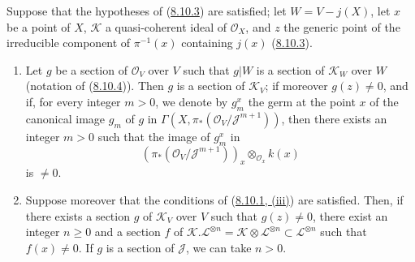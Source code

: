 \begin{corollary}[8.10.5]
\label{II.8.10.5}
Suppose that the hypotheses of (\hyperref[II.8.10.3]{8.10.3}) are
satisfied; let $W=V-j(X)$, let $x$ be a point of $X$, $\mathcal{K}$ a
quasi-coherent ideal of $\mathcal{O}_X$, and $z$ the generic point of the
irreducible component of $\pi^{-1}(x)$ containing $j(x)$
(\hyperref[II.8.10.3]{8.10.3}).
\begin{enumerate}
  \item[\rm{(i)}] Let $g$ be a section of $\mathcal{O}_V$ over $V$
  such that $g|W$ is a section of $\mathcal{K}_W$ over $W$
  (notation of (\hyperref[II.8.10.4]{8.10.4})). Then $g$ is a section
  of $\mathcal{K}_V$; if moreover $g(z)\neq0$, and if, for every integer
  $m>0$, we denote by $g_m^x$ the germ at the point $x$ of the canonical
  image $g_m$ of $g$ in
  $\Gamma(X,\pi_*(\mathcal{O}_V/\mathcal{J}^{m+1}))$, then there exists an
  integer $m>0$ such that the image of $g_m^x$ in
  \[
    (\pi_*(\mathcal{O}_V/\mathcal{J}^{m+1}))_x
    \otimes_{\mathcal{O}_x}k(x)
  \]
  is $\neq0$.
  \item[\rm{(ii)}] Suppose moreover that the conditions of
  (\hyperref[II.8.10.1]{8.10.1, (iii)}) are satisfied. Then, if there exists
  a section $g$ of $\mathcal{K}_V$ over $V$ such that $g(z)\neq0$,
  there exist an integer $n\geqslant0$ and a section $f$ of
  $\mathcal{K}.\mathcal{L}^{\otimes n}=
  \mathcal{K}\otimes\mathcal{L}^{\otimes n}\subset\mathcal{L}^{\otimes n}$
  such that $f(x)\neq0$. If $g$ is a section of $\mathcal{J}$, we can
  take $n>0$.
\end{enumerate}
\end{corollary}


